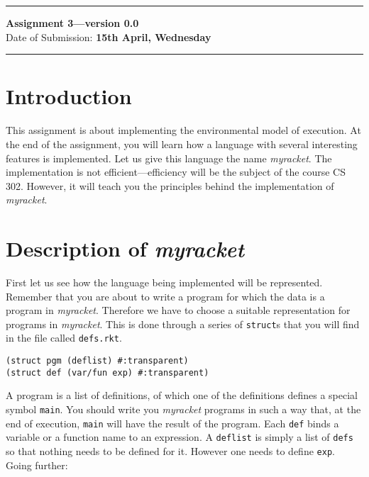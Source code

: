 \documentclass[11pt]{article}
\newcommand{\myr}{\textit{myracket}}
\begin{document}
\hrule
\begin{center}
            {\large \bf Assignment 3---version 0.0}
                                                  \\
\bigskip
Date  of  Submission:  {\bf 15th April, Wednesday}
\hfill

\end{center}
\bigskip

\hrule
\bigskip
\section{Introduction}
This assignment is about implementing the environmental model of execution. At the end of the assignment, you will learn how a language with several interesting features is implemented. Let us give this language the name \myr. The implementation is not efficient---efficiency  will be the subject of the course CS 302. However, it will teach you the principles behind the implementation of \myr. 
\section{Description of \myr}
First let us see how the language being implemented will be represented. Remember that you are about to write a program for which the data is a program in {\myr}. Therefore we have to choose a suitable representation for programs in \myr. This is done through a series of {\tt struct}s that you will find in the file called {\tt defs.rkt}.

\begin{verbatim}
(struct pgm (deflist) #:transparent)
(struct def (var/fun exp) #:transparent)
\end{verbatim}

A program is a list of definitions, of which one of the definitions defines a special symbol  {\tt main}. You should write you {\myr} programs in such a way that, at the end of execution, {\tt main} will have the result of the program. Each {\tt def} binds a variable or a function name to an expression. A {\tt deflist} is simply a list of {\tt defs} so that nothing needs to be defined for it. However one needs to define {\tt exp}.
Going further:
\end{document}

